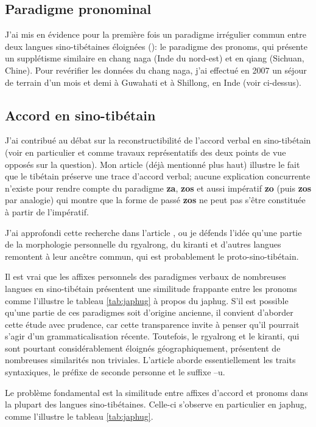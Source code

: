 \documentclass[oldfontcommands,oneside,a4paper,11pt]{memoir}
\newcommand{\ipa}[1]{{\phon\textbf{#1}}}
\begin{document}
	\subsection{Paradigme pronominal}
J’ai mis en évidence pour la première fois un paradigme irrégulier commun entre deux langues sino-tibétaines éloignées (\citealt{jacques07chang}): le paradigme des pronoms, qui présente un supplétisme similaire en chang naga (Inde du nord-est) et en qiang (Sichuan, Chine). Pour revérifier les données du chang naga, j’ai effectué en 2007 un séjour de terrain d’un mois et demi à Guwahati et à Shillong, en Inde (voir ci-dessus).

\subsection{Accord en sino-tibétain}
J'ai contribué au débat sur la reconstructibilité de l'accord verbal en sino-tibétain (voir en particulier \citet{lapolla03} et \citet{delancey10agreement} comme travaux représentatifs des deux points de vue opposés sur la question). Mon article \citet{jacques10zos} (déjà mentionné plus haut) illustre le fait que le tibétain préserve une trace d'accord verbal; aucune explication concurrente n'existe pour rendre compte du paradigme \ipa{za}, \ipa{zos} et aussi impératif \ipa{zo} (puis \ipa{zos} par analogie) qui montre que la forme de passé \ipa{zos} ne peut pas s'être constituée à partir de l'impératif.

J'ai approfondi cette recherche   dans l'article \citet{jacques12agreement}, ou je défends l'idée qu'une partie de la morphologie personnelle du rgyalrong, du kiranti et d'autres langues remontent à leur ancêtre commun, qui est probablement le proto-sino-tibétain.

Il est vrai que les affixes personnels des paradigmes verbaux  de nombreuses langues en sino-tibétain présentent une similitude frappante entre les pronoms  comme l'illustre le  tableau \ref{tab:japhug} à propos du japhug. S'il est possible qu'une partie de ces paradigmes soit d'origine ancienne, il convient d'aborder cette étude avec prudence, car cette transparence invite à penser qu'il pourrait s'agir d'un grammaticalisation récente. Toutefois, le rgyalrong et le kiranti, qui sont pourtant considérablement éloignés géographiquement, présentent de nombreuses similarités non triviales. L'article \citet{jacques12agreement} aborde essentiellement les traits syntaxiques, le préfixe de seconde personne et le suffixe --u.

Le problème fondamental est la similitude entre affixes d'accord et pronoms dans la plupart des langues sino-tibétaines. Celle-ci s'observe en particulier en japhug, comme l'illustre le tableau \ref{tab:japhug}.
\end{document}
